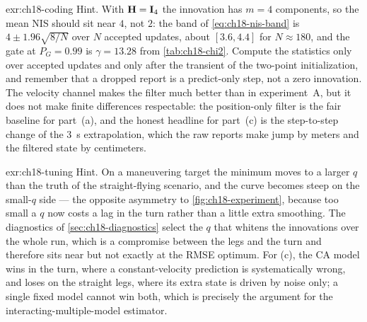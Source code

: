 \begin{solution}{exr:ch18-coding}
Hint. With $\mathbf{H}=\mathbf{I}_4$ the innovation has $m=4$ components, so the mean NIS should sit near $4$, not $2$: the band of \cref{eq:ch18-nis-band} is $4\pm1.96\sqrt{8/N}$ over $N$ accepted updates, about $[3.6,4.4]$ for $N\approx180$, and the gate at $P_G=0.99$ is $\gamma=13.28$ from \cref{tab:ch18-chi2}. Compute the statistics only over accepted updates and only after the transient of the two-point initialization, and remember that a dropped report is a predict-only step, not a zero innovation. The velocity channel makes the filter much better than in experiment~A, but it does not make finite differences respectable: the position-only filter is the fair baseline for part~(a), and the honest headline for part~(c) is the step-to-step change of the $3$~s extrapolation, which the raw reports make jump by meters and the filtered state by centimeters.
\end{solution}

\begin{solution}{exr:ch18-tuning}
Hint. On a maneuvering target the minimum moves to a larger $q$ than the truth of the straight-flying scenario, and the curve becomes steep on the small-$q$ side --- the opposite asymmetry to \cref{fig:ch18-experiment}, because too small a $q$ now costs a lag in the turn rather than a little extra smoothing. The diagnostics of \cref{sec:ch18-diagnostics} select the $q$ that whitens the innovations over the whole run, which is a compromise between the legs and the turn and therefore sits near but not exactly at the RMSE optimum. For (c), the CA model wins in the turn, where a constant-velocity prediction is systematically wrong, and loses on the straight legs, where its extra state is driven by noise only; a single fixed model cannot win both, which is precisely the argument for the interacting-multiple-model estimator.
\end{solution}
